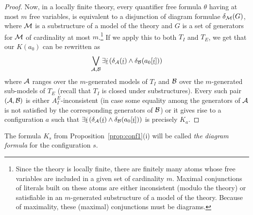 \documentclass{LMCS}
\newcommand{\ui}{\ensuremath{\underline i}}
\newcommand{\cA}{\ensuremath \mathcal A}
\newcommand{\cB}{\ensuremath \mathcal B}
\newcommand{\cM}{\ensuremath \mathcal M}
\theoremstyle{plain}\newtheorem{assumption}[thm]{Assumption}
\theoremstyle{plain}\newtheorem{proposition}[thm]{Proposition}
\theoremstyle{plain}\newtheorem{property}[thm]{Property}
\theoremstyle{plain}\newtheorem{example}[thm]{Example}
\theoremstyle{plain}\newtheorem{claim}[thm]{Claim}
\theoremstyle{plain}\newtheorem{lemma}[thm]{Lemma}
\begin{document}
\begin{proof}
  Now, in a locally finite theory, every quantifier free formula
  $\theta$ having at most $m$ free variables, is equivalent to a
  disjunction of diagram formulae $\delta_{\cM}(G)$, where $\cM$ is a
  substructure of a model of the theory and $G$ is a set of generators
  for $\cM$ of cardinality at most $m$.\footnote{Since the theory is
    locally finite, there are finitely many atoms whose free variables
    are included in a given set of cardinality $m$. Maximal
    conjunctions of literals built on these atoms are either
    inconsistent (modulo the theory) or satisfiable in an
    $m$-generated substructure of a model of the theory. Because of
    maximality, these (maximal) conjunctions must be diagrams.} If we
  apply this to both $T_I$ and $T_E$, we get that our $K(a_0)$ can be
  rewritten as
  \begin{equation*}
    \bigvee_{\cA, \cB} \exists \ui\, (\delta_{\cA}(\ui) \wedge
    \delta_{\cB}(a_0[\ui]))
  \end{equation*}
  where $\cA$ ranges over the $m$-generated models of $T_I$ and $\cB$
  over the $m$-generated sub-models of $T_E$ (recall that $T_I$ is
  closed under substructures). Every such pair $(\cA, \cB)$ is either
  $A^E_I$-inconsistent (in case some equality among the generators of
  $\cA$ is not satisfied by the corresponding generators of $\cB$) or
  it gives rise to a configuration $a$ such that $\exists \ui\,
  (\delta_{\cA}(\ui) \wedge \delta_{\cB}(a_0[\ui]))$ is precisely
  $K_a$.
\end{proof}
The formula $K_s$ from Proposition~\ref{prop:conf1}(i) will be called
\emph{the diagram formula} for the configuration $s$.
\end{document}
